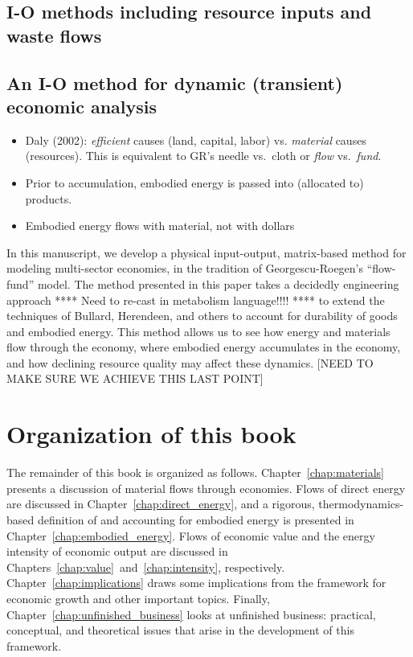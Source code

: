 \subsection{I-O methods including resource inputs and waste flows}
\label{sec:IO_waste}

\cite{Lenzen1998}\cite{ConAccount1998}\cite{Hoekstra2003}\cite{Bailey2008}
\cite{Pedersen2006}\cite{Turner2007}

\subsection{An I-O method for dynamic (transient) economic analysis}
\label{sec:IO_dynamic}

\begin{itemize}
	\item{Daly (2002)\cite{Daly2002}: \emph{efficient} causes (land, capital, labor) vs. \emph{material} causes (resources).
	This is equivalent to GR's needle vs.\ cloth or \emph{flow} vs.\ \emph{fund}.}
		\item{Prior to accumulation, embodied energy is passed into (allocated to) products.}	
	\item{Embodied energy flows with material, not with dollars}
\end{itemize}

In this manuscript, we develop a physical input-output, 
matrix-based method for modeling multi-sector economies, 
in the tradition of Georgescu-Roegen's ``flow-fund'' 
model.\cite{G-R1979a, G-R1979b} 
The method presented in this paper takes a decidedly engineering approach
**** Need to re-cast in metabolism language!!!! **** 
to extend the techniques of Bullard, Herendeen, and others 
to account for durability of goods and embodied energy. 
This method allows us to see how energy and materials flow through the economy, 
where embodied energy accumulates in the economy, 
and how declining resource quality may affect these dynamics. 
[NEED TO MAKE SURE WE ACHIEVE THIS LAST POINT]

\section{Organization of this book}
\label{sec:structure}

The remainder of this book is organized as follows. 
Chapter~\ref{chap:materials} presents a discussion of material flows through economies.
Flows of direct energy are discussed in Chapter~\ref{chap:direct_energy}, 
and a rigorous, thermodynamics-based definition of and accounting for 
embodied energy is presented in Chapter~\ref{chap:embodied_energy}. 
Flows of economic value and the energy intensity of economic output are
discussed in Chapters~\ref{chap:value}~and~\ref{chap:intensity}, respectively.
Chapter~\ref{chap:implications} draws some implications 
from the framework for economic growth and other important topics.
Finally, Chapter~\ref{chap:unfinished_business} looks at 
unfinished business: practical, conceptual, and theoretical issues
that arise in the development of this framework.

